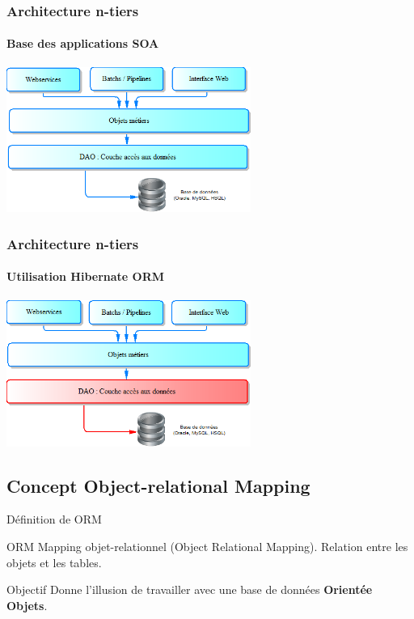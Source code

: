 \documentclass[compress]{beamer}%
\begin{document}
\begin{frame}
	\frametitle{Architecture n-tiers}
	\framesubtitle{Base des applications SOA}
	
	\begin{center}	
	\includegraphics[width=8cm]{images/arch_n_tiers_all.png}
	\end{center}
	\end{frame}

	\begin{frame}
	\frametitle{Architecture n-tiers}
	\framesubtitle{Utilisation Hibernate ORM}
	
	\begin{center}	
	\includegraphics[width=8cm]{images/arch_n_tiers_hibernate.png}
	\end{center}
\end{frame}
	
	
\subsection{Concept Object-relational Mapping}	
		
\begin{frame}{Définition de ORM}
	
	\begin{block}{ORM}
	Mapping objet-relationnel (Object Relational Mapping). Relation entre les objets et les tables.
	\end{block}

	\pause
	\begin{block}{Objectif}	
	Donne l'illusion de travailler avec une base de données \textbf{Orientée Objets}.
	\end{block}
	
\end{frame}
		
\end{document}

